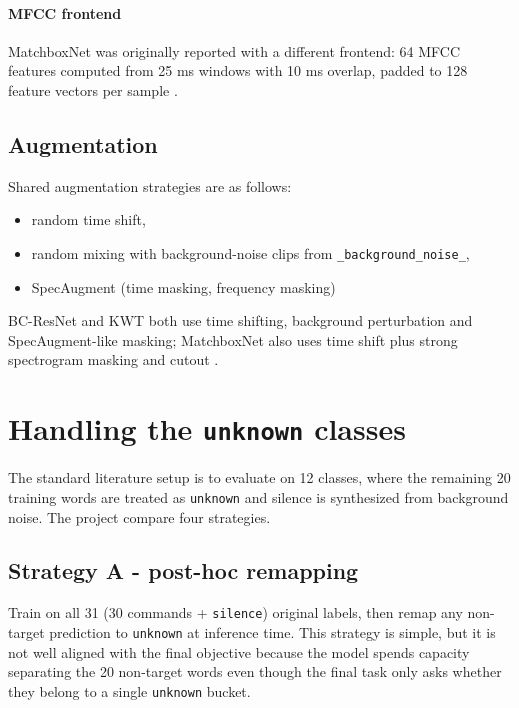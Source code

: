 \documentclass[11pt]{article}
\begin{document}
\paragraph{MFCC  frontend}

MatchboxNet was originally reported with a different frontend: 64 MFCC features computed from 25 ms windows with 10 ms overlap, padded to 128 feature vectors per sample \cite{matchbox}.

\subsection{Augmentation}

Shared augmentation strategies are as follows:
\begin{itemize}[leftmargin=*]
    \item random time shift,
    \item random mixing with background-noise clips from \texttt{\_background\_noise\_},
    \item SpecAugment (time masking, frequency masking)
\end{itemize}

BC-ResNet and KWT both use time shifting, background perturbation and SpecAugment-like masking; MatchboxNet also uses time shift plus strong spectrogram masking and cutout \cite{bcresnet,kwt,matchbox}.

\section{Handling the \texttt{unknown} classes}

The standard literature setup is to evaluate on 12 classes, where the remaining 20 training words are treated as \texttt{unknown} and silence is synthesized from background noise. The project compare four strategies.

\subsection*{Strategy A - post-hoc remapping}

Train on all 31 (30 commands + \texttt{silence}) original labels, then remap any non-target prediction to \texttt{unknown} at inference time. This strategy is simple, but it is not well aligned with the final objective because the model spends capacity separating the 20 non-target words even though the final task only asks whether they belong to a single \texttt{unknown} bucket.
\end{document}
